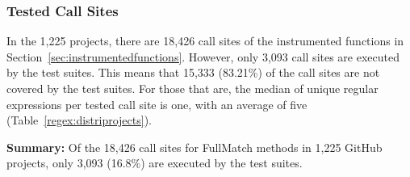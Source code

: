 \subsubsection{Tested Call Sites}
In the 1,225 projects, there are  18,426 call sites of the instrumented functions in Section~\ref{sec:instrumentedfunctions}. However, only 3,093 call sites are executed by the test suites. 
This means that 15,333 (83.21\%) of the call sites are not covered by the test suites. For those that are, the median of unique regular expressions per tested call site is one, with an average of five (Table~\ref{regex:distriprojects}). 


\textbf{Summary:}
Of the 18,426 call sites for FullMatch methods in 1,225 GitHub projects, only 3,093 (16.8\%) are executed by the test suites. 









